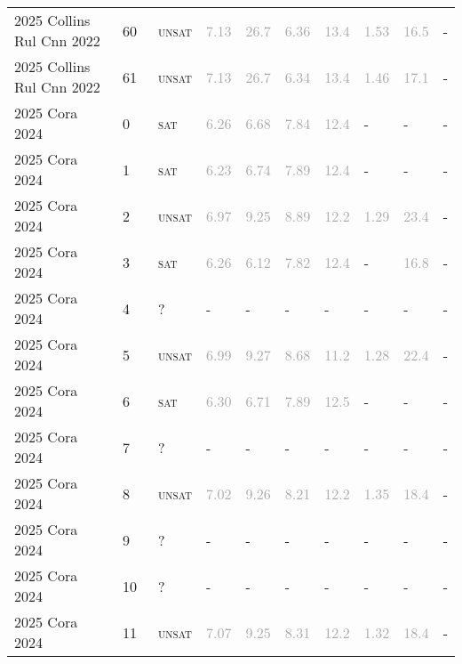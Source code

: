 \begin{center}
{\begin{longtable}{@{}llllllllll@{}}
2025 Collins Rul Cnn 2022 & 60 & ~\textsc{unsat} & \textcolor{darkgray}{7.13} & \textcolor{darkgray}{26.7} & \textcolor{darkgray}{6.36} & \textcolor{darkgray}{13.4} & \textcolor{darkgray}{1.53} & \textcolor{darkgray}{16.5} & - \\
2025 Collins Rul Cnn 2022 & 61 & ~\textsc{unsat} & \textcolor{darkgray}{7.13} & \textcolor{darkgray}{26.7} & \textcolor{darkgray}{6.34} & \textcolor{darkgray}{13.4} & \textcolor{darkgray}{1.46} & \textcolor{darkgray}{17.1} & - \\
\midrule
2025 Cora 2024 & 0 & ~\textsc{sat} & \textcolor{darkgray}{6.26} & \textcolor{darkgray}{6.68} & \textcolor{darkgray}{7.84} & \textcolor{darkgray}{12.4} & - & - & - \\
2025 Cora 2024 & 1 & ~\textsc{sat} & \textcolor{darkgray}{6.23} & \textcolor{darkgray}{6.74} & \textcolor{darkgray}{7.89} & \textcolor{darkgray}{12.4} & - & - & - \\
2025 Cora 2024 & 2 & ~\textsc{unsat} & \textcolor{darkgray}{6.97} & \textcolor{darkgray}{9.25} & \textcolor{darkgray}{8.89} & \textcolor{darkgray}{12.2} & \textcolor{darkgray}{1.29} & \textcolor{darkgray}{23.4} & - \\
2025 Cora 2024 & 3 & ~\textsc{sat} & \textcolor{darkgray}{6.26} & \textcolor{darkgray}{6.12} & \textcolor{darkgray}{7.82} & \textcolor{darkgray}{12.4} & - & \textcolor{darkgray}{16.8} & - \\
2025 Cora 2024 & 4 & ~? & - & - & - & - & - & - & - \\
2025 Cora 2024 & 5 & ~\textsc{unsat} & \textcolor{darkgray}{6.99} & \textcolor{darkgray}{9.27} & \textcolor{darkgray}{8.68} & \textcolor{darkgray}{11.2} & \textcolor{darkgray}{1.28} & \textcolor{darkgray}{22.4} & - \\
2025 Cora 2024 & 6 & ~\textsc{sat} & \textcolor{darkgray}{6.30} & \textcolor{darkgray}{6.71} & \textcolor{darkgray}{7.89} & \textcolor{darkgray}{12.5} & - & - & - \\
2025 Cora 2024 & 7 & ~? & - & - & - & - & - & - & - \\
2025 Cora 2024 & 8 & ~\textsc{unsat} & \textcolor{darkgray}{7.02} & \textcolor{darkgray}{9.26} & \textcolor{darkgray}{8.21} & \textcolor{darkgray}{12.2} & \textcolor{darkgray}{1.35} & \textcolor{darkgray}{18.4} & - \\
2025 Cora 2024 & 9 & ~? & - & - & - & - & - & - & - \\
2025 Cora 2024 & 10 & ~? & - & - & - & - & - & - & - \\
2025 Cora 2024 & 11 & ~\textsc{unsat} & \textcolor{darkgray}{7.07} & \textcolor{darkgray}{9.25} & \textcolor{darkgray}{8.31} & \textcolor{darkgray}{12.2} & \textcolor{darkgray}{1.32} & \textcolor{darkgray}{18.4} & - \\

\end{longtable}}
\end{center}
